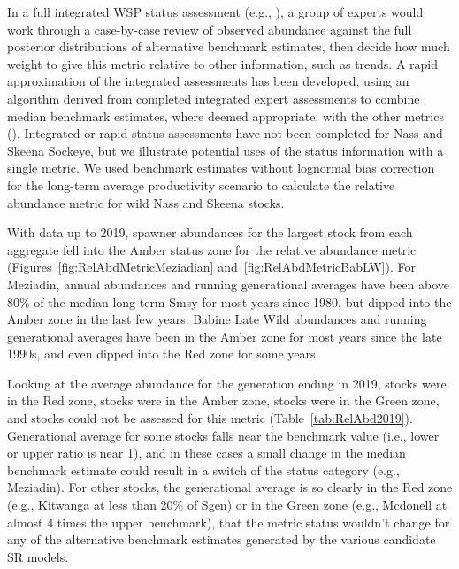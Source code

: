 \documentclass[french,11pt]{book}
\begin{document}
In a full integrated WSP status assessment (e.g., ), a group of experts would work through a case-by-case review of observed abundance against the full posterior distributions of alternative benchmark estimates, then decide how much weight to give this metric relative to other information, such as trends. A rapid approximation of the integrated assessments has been developed, using an algorithm derived from completed integrated expert assessments to combine median benchmark estimates, where deemed appropriate, with the other metrics (). Integrated or rapid status assessments have not been completed for Nass and Skeena Sockeye, but we illustrate potential uses of the status information with a single metric. We used benchmark estimates without lognormal bias correction for the long-term average productivity scenario to calculate the relative abundance metric for wild Nass and Skeena stocks.

With data up to 2019, spawner abundances for the largest stock from each aggregate fell into the Amber status zone for the relative abundance metric (Figures~\ref{fig:RelAbdMetricMeziadian} and~\ref{fig:RelAbdMetricBabLW}). For Meziadin, annual abundances and running generational averages have been above 80\% of the median long-term Smsy for most years since 1980, but dipped into the Amber zone in the last few years. Babine Late Wild abundances and running generational averages have been in the Amber zone for most years since the late 1990s, and even dipped into the Red zone for some years.

Looking at the average abundance for the generation ending in 2019,  stocks were in the Red zone,  stocks were in the Amber zone,  stocks were in the Green zone, and  stocks could not be assessed for this metric (Table~\ref{tab:RelAbd2019}). Generational average for some stocks falls near the benchmark value (i.e., lower or upper ratio is near 1), and in these cases a small change in the median benchmark estimate could result in a switch of the status category (e.g., Meziadin). For other stocks, the generational average is so clearly in the Red zone (e.g., Kitwanga at less than 20\% of Sgen) or in the Green zone (e.g., Mcdonell at almost 4 times the upper benchmark), that the metric status wouldn't change for any of the alternative benchmark estimates generated by the various candidate SR models.
\end{document}
